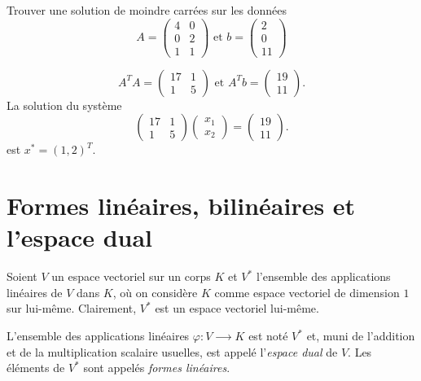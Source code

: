 \begin{example}
\label{exe:4}
Trouver une solution de moindre carrées sur les données 
\begin{displaymath}
  A =
  \begin{pmatrix}
    4 & 0 \\ 0 &2 \\ 1 & 1
  \end{pmatrix}
\text{ et }  b =
\begin{pmatrix}
  2\\0\\11
\end{pmatrix}
\end{displaymath}  

\begin{displaymath}
  A^T A =
  \begin{pmatrix}
    17 & 1 \\
    1 & 5
  \end{pmatrix} \text{ et } A^T b =
  \begin{pmatrix}
    19 \\ 11
  \end{pmatrix}. 
\end{displaymath}
La solution du système 
\begin{displaymath}
   \begin{pmatrix}
    17 & 1 \\
    1 & 5
  \end{pmatrix}
  \begin{pmatrix}
    x_1\\x_2
  \end{pmatrix}
= \begin{pmatrix}
    19 \\ 11
  \end{pmatrix}.
\end{displaymath}
est $x^* = (1,2)^T$. 
\end{example}








\section{Formes linéaires, bilinéaires et l'espace dual}
\label{sec:lespace-dual}


Soient $V$ un espace vectoriel sur un corps $K$ et $V^*$ l'ensemble  des  applications linéaires de $V$ dans $K$, où on considère $K$ comme espace vectoriel de dimension $1$ sur lui-même. Clairement, $V^*$ est un espace vectoriel lui-même. 
\begin{definition}
\label{def:9}
  L'ensemble des  applications linéaires  $φ : V ⟶ K$ est noté $V^*$ et, muni de l'addition et de la multiplication scalaire usuelles, est appelé l'\emph{espace dual} de $V$. Les éléments de $V^*$ sont appelés \emph{formes linéaires}.
\end{definition}

